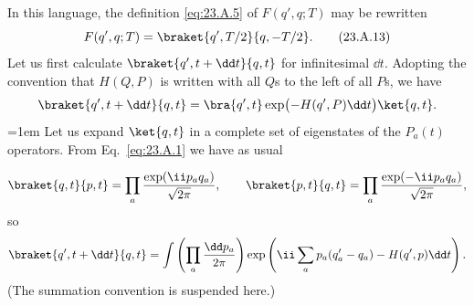 In this language, the definition \eqref{eq:23.A.5} of $F(q',q;T)$ may be rewritten
\begin{equation}
 F(q',q;T)=\braket{q',T/2}{q,-T/2}.
 \tag{23.A.13}\label{eq:23.A.13}
\end{equation}
Let us first calculate $\braket{q',t+\dd t}{q,t}$ for infinitesimal $\dd t$. Adopting the convention that $H(Q,P)$ is written with all $Q$s to the left of all $P$s, we have
\[
 \braket{q',t+\dd t}{q,t}
 =\bra{q',t}\exp\bigl(-H(q',P)\dd t\bigr)\ket{q,t}.
\]
\begingroup
\emergencystretch=1em
Let us expand $\ket{q,t}$ in a complete set of eigenstates of the $P_a(t)$ operators. From Eq.~\eqref{eq:23.A.1} we have as usual
\par
\endgroup
\[
 \braket{q,t}{p,t}
 =\prod_a\frac{\exp(\ii p_aq_a)}{\sqrt{2\pi}},
 \qquad
 \braket{p,t}{q,t}
 =\prod_a\frac{\exp(-\ii p_aq_a)}{\sqrt{2\pi}},
\]
so
\[
 \braket{q',t+\dd t}{q,t}
 =\int\left(\prod_a\frac{\dd p_a}{2\pi}\right)
 \exp\left(
 \ii\sum_a p_a(q'_a-q_a)-H(q',p)\dd t
 \right).
\]
(The summation convention is suspended here.)

